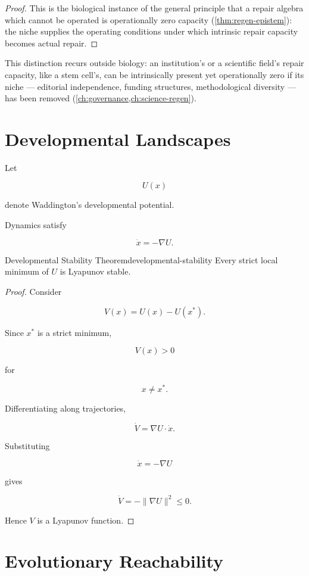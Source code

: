 \documentclass[12pt,twoside,openright]{book}
\begin{document}
\begin{proof}
  This is the biological instance of the general principle that
  a repair algebra which cannot be operated is operationally
  zero capacity (\cref{thm:regen-epistem}): the niche supplies
  the operating conditions under which intrinsic repair
  capacity becomes actual repair.
\end{proof}

This distinction recurs outside biology: an institution's or a
scientific field's repair capacity, like a stem cell's, can be
intrinsically present yet operationally zero if its niche ---
editorial independence, funding structures, methodological
diversity --- has been removed (\cref{ch:governance,ch:science-regen}).

\section{Developmental Landscapes}

Let

\[
U(x)
\]

denote Waddington's developmental potential.

Dynamics satisfy

\[
\dot x
=
-\nabla U.
\]

\begin{theorem}{Developmental Stability Theorem}{developmental-stability}
Every strict local minimum of \(U\) is Lyapunov stable.
\end{theorem}

\begin{proof}
Consider

\[
V(x)
=
U(x)-U(x^*).
\]

Since \(x^*\) is a strict minimum,

\[
V(x)>0
\]

for

\[
x\neq x^*.
\]

Differentiating along trajectories,

\[
\dot V
=
\nabla U\cdot \dot x.
\]

Substituting

\[
\dot x=-\nabla U
\]

gives

\[
\dot V
=
-\|\nabla U\|^2
\le0.
\]

Hence \(V\) is a Lyapunov function.
\end{proof}

\section{Evolutionary Reachability}
\end{document}

